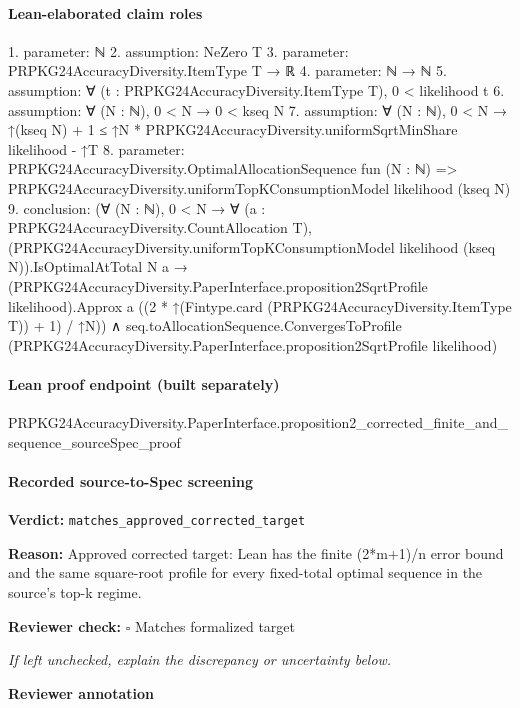 \documentclass[10pt]{article}
\newcommand{\reviewerbox}{%
  \par\noindent\fbox{\parbox{0.96\linewidth}{\rule{0pt}{0.38in}}}\par
}
\newcommand{\reviewmatch}[1]{%
  \par\noindent\textbf{Reviewer check:} $\square$\; #1\par
  \noindent\emph{If left unchecked, explain the discrepancy or uncertainty below.}\par
}
\begin{document}
\paragraph{Lean-elaborated claim roles}\begin{ReviewVerbatim}
1. parameter: ℕ
2. assumption: NeZero T
3. parameter: PRPKG24AccuracyDiversity.ItemType T → ℝ
4. parameter: ℕ → ℕ
5. assumption: ∀ (t : PRPKG24AccuracyDiversity.ItemType T), 0 < likelihood t
6. assumption: ∀ (N : ℕ), 0 < N → 0 < kseq N
7. assumption: ∀ (N : ℕ), 0 < N → ↑(kseq N) + 1 ≤ ↑N * PRPKG24AccuracyDiversity.uniformSqrtMinShare likelihood - ↑T
8. parameter: PRPKG24AccuracyDiversity.OptimalAllocationSequence fun (N : ℕ) =>
  PRPKG24AccuracyDiversity.uniformTopKConsumptionModel likelihood (kseq N)
9. conclusion: (∀ (N : ℕ),
    0 < N →
      ∀ (a : PRPKG24AccuracyDiversity.CountAllocation T),
        (PRPKG24AccuracyDiversity.uniformTopKConsumptionModel likelihood (kseq N)).IsOptimalAtTotal N a →
          (PRPKG24AccuracyDiversity.PaperInterface.proposition2SqrtProfile likelihood).Approx a
            ((2 * ↑(Fintype.card (PRPKG24AccuracyDiversity.ItemType T)) + 1) / ↑N)) ∧
  seq.toAllocationSequence.ConvergesToProfile
    (PRPKG24AccuracyDiversity.PaperInterface.proposition2SqrtProfile likelihood)
\end{ReviewVerbatim}

\paragraph{Lean proof endpoint (built separately)}\begin{ReviewVerbatim}
PRPKG24AccuracyDiversity.PaperInterface.proposition2_corrected_finite_and_sequence_sourceSpec_proof
\end{ReviewVerbatim}

\paragraph{Recorded source-to-Spec screening}
\textbf{Verdict:} \texttt{matches\_approved\_corrected\_target}
\\
{\raggedright
\textbf{Reason:} Approved corrected target:\allowbreak{} Lean has the finite (2*m+1)/\allowbreak{}n error bound and the same square-\allowbreak{}root profile for every fixed-\allowbreak{}total optimal sequence in the source's top-\allowbreak{}k regime.\allowbreak{}
\par}
\reviewmatch{Matches formalized target}
\noindent\textbf{Reviewer annotation}\par
\reviewerbox
\clearpage
\hypertarget{source-claim-f61ea0b8a68fcc23}{}
\end{document}

